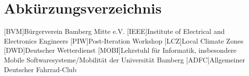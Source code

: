 \chapter*{Abkürzungsverzeichnis}

\begin{acronym}
    [BVM]{Bürgerverein Bamberg Mitte e.V.}
    [IEEE]{Institute of Electrical and Electronics Engineers}
    [PIW]{Post-Iteration Workshop}
    [LCZ]{Local Climate Zones}
    [DWD]{Deutscher Wetterdienst}
    [MOBI]{Lehrstuhl für Informatik, insbesondere Mobile Softwaresysteme/Mobilität der Universität Bamberg}
    [ADFC]{Allgemeiner Deutscher Fahrrad-Club}
\end{acronym}